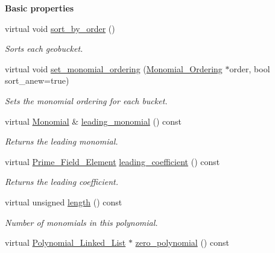 \begin{Indent}\textbf{ Basic properties}\par
\begin{DoxyCompactItemize}
\item 
virtual void \hyperlink{class_polynomial___geobucket_a13bc2e2e8200ee741d751ad2a55e2cfb}{sort\+\_\+by\+\_\+order} ()
\begin{DoxyCompactList}\small\item\em Sorts each geobucket. \end{DoxyCompactList}\item 
virtual void \hyperlink{class_polynomial___geobucket_a77030f8f042b33358d74012f039f69e4}{set\+\_\+monomial\+\_\+ordering} (\hyperlink{class_monomial___ordering}{Monomial\+\_\+\+Ordering} $\ast$order, bool sort\+\_\+anew=true)
\begin{DoxyCompactList}\small\item\em Sets the monomial ordering for each bucket. \end{DoxyCompactList}\item 
virtual \hyperlink{class_monomial}{Monomial} \& \hyperlink{class_polynomial___geobucket_a98df9b7c843b0b375af0727ef1f54a80}{leading\+\_\+monomial} () const
\begin{DoxyCompactList}\small\item\em Returns the leading monomial. \end{DoxyCompactList}\item 
virtual \hyperlink{class_prime___field___element}{Prime\+\_\+\+Field\+\_\+\+Element} \hyperlink{class_polynomial___geobucket_a1a4d713112fb492dc322d717b2387dbd}{leading\+\_\+coefficient} () const
\begin{DoxyCompactList}\small\item\em Returns the leading coefficient. \end{DoxyCompactList}\item 
virtual unsigned \hyperlink{class_polynomial___geobucket_a42b1c165e65da192cdbed556239c7c29}{length} () const
\begin{DoxyCompactList}\small\item\em Number of monomials in this polynomial. \end{DoxyCompactList}\item 
\mbox{\label{class_polynomial___geobucket_ab9b4ee42fbad480c1503269ae5d4b9e7}} 
virtual \hyperlink{class_polynomial___linked___list}{Polynomial\+\_\+\+Linked\+\_\+\+List} $\ast$ \hyperlink{class_polynomial___geobucket_ab9b4ee42fbad480c1503269ae5d4b9e7}{zero\+\_\+polynomial} () const

\end{DoxyCompactItemize}
\end{Indent}

